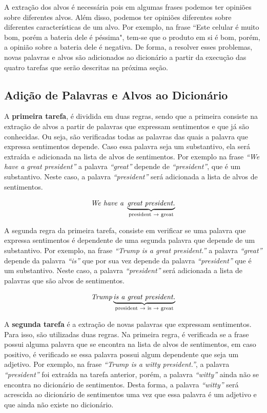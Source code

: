 A extração dos alvos é necessária pois em algumas frases
podemos ter opiniões sobre diferentes alvos. Além disso, podemos
ter opiniões diferentes sobre diferentes características de um alvo. Por
exemplo, na frase ``Este celular é muito bom, porém a bateria dele é péssima", tem-se que o produto em si é bom, porém, a opinião sobre a bateria dele é negativa. De
forma, a resolver esses problemas, novas palavras e alvos são adicionados ao
dicionário a partir da execução das quatro tarefas que serão descritas na
próxima seção.

\subsection{Adição de Palavras e Alvos ao Dicionário}

A \textbf{primeira tarefa}, é dividida em duas regras, sendo que a primeira
consiste na extração de alvos a partir de palavras que expressam sentimentos e
que já são conhecidas. Ou seja, são verificadas todas as palavras das quais a palavra que
expressa sentimentos depende. Caso essa palavra seja um substantivo, ela será
extraída e adicionada na lista de alvos de sentimentos. Por exemplo na frase \textit{``We have a great president''} a palavra \textit{``great''} depende de \textit{``president''}, que é um substantivo. Neste caso, a palavra \textit{``president''} será adicionada a
lista de alvos de sentimentos.

\[\textit{We have a } \underbrace{\textit{great president.}}_\text{president
\textrightarrow \text{ great}}\]

A segunda regra da primeira tarefa,
consiste em verificar se uma palavra que expressa sentimentos é dependente de
uma segunda palavra que depende de um substantivo.
Por exemplo, na frase \textit{``Trump is a great president.''} a palavra
\textit{``great''} depende da palavra \textit{``is''} que por sua vez depende da
palavra \textit{``president''} que é um substantivo. Neste caso, a palavra
\textit{``president''} será adicionada a lista de palavras que são alvos de sentimentos.

\[\textit{Trump} \underbrace{\textit{is a great president.}}_\text{president
\textrightarrow \text{ is} \textrightarrow \text{ great}}\]

A \textbf{segunda tarefa} é a extração de novas palavras que expressam
sentimentos. Para isso, são utilizadas duas regras. Na primeira regra, é
verificada se a frase possui alguma palavra que se encontra na lista de alvos de
sentimentos, em caso positivo, é verificado se essa palavra possui algum dependente que seja um adjetivo. Por exemplo, na frase \textit{``Trump is a witty president.''}, a palavra \textit{``president''} foi
extraída na tarefa anterior, porém, a palavra \textit{``witty''} ainda não se
encontra no dicionário de sentimentos.
Desta forma, a palavra \textit{``witty''} será acrescida ao
dicionário de sentimentos uma vez que essa palavra é um adjetivo e que ainda não
existe no dicionário.


